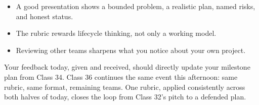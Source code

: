 \classclosingframe
{\begin{itemize}
\item A good presentation shows a bounded problem, a realistic plan, named risks, and honest status.
\item The rubric rewards lifecycle thinking, not only a working model.
\item Reviewing other teams sharpens what you notice about your own project.
\end{itemize}}
{Your feedback today, given and received, should directly update your milestone plan from Class 34.}
{Class 36 continues the same event this afternoon: same rubric, same format, remaining teams.}
{One rubric, applied consistently across both halves of today, closes the loop from Class 32's pitch to a defended plan.}


